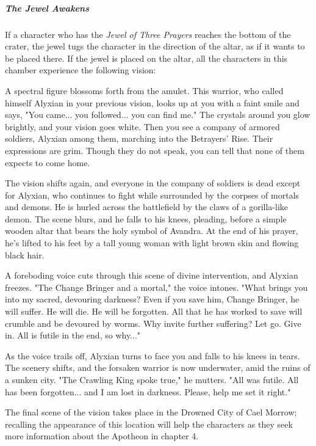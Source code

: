 \documentclass[10pt,a4paper,twoside,bg=print,twocolumn,openany,nodeprecatedcode]{dndbook}
\begin{document}
\subparagraph{The Jewel Awakens}
If a character who has the \textit{Jewel of Three Prayers} reaches the bottom of the crater, the jewel tugs the character in the direction of the altar, as if it wants to be placed there. If the jewel is placed on the altar, all the characters in this chamber experience the following vision:

\begin{DndReadAloud}{}
A spectral figure blossoms forth from the amulet. This warrior, who called himself Alyxian in your previous vision, looks up at you with a faint smile and says, "You came... you followed... you can find me." The crystals around you glow brightly, and your vision goes white. Then you see a company of armored soldiers, Alyxian among them, marching into the Betrayers' Rise. Their expressions are grim. Though they do not speak, you can tell that none of them expects to come home.

The vision shifts again, and everyone in the company of soldiers is dead except for Alyxian, who continues to fight while surrounded by the corpses of mortals and demons. He is hurled across the battlefield by the claws of a gorilla-like demon. The scene blurs, and he falls to his knees, pleading, before a simple wooden altar that bears the holy symbol of Avandra. At the end of his prayer, he's lifted to his feet by a tall young woman with light brown skin and flowing black hair.

A foreboding voice cuts through this scene of divine intervention, and Alyxian freezes. "The Change Bringer and a mortal," the voice intones. "What brings you into my sacred, devouring darkness? Even if you save him, Change Bringer, he will suffer. He will die. He will be forgotten. All that he has worked to save will crumble and be devoured by worms. Why invite further suffering? Let go. Give in. All is futile in the end, so why..."

As the voice trails off, Alyxian turns to face you and falls to his knees in tears. The scenery shifts, and the forsaken warrior is now underwater, amid the ruins of a sunken city. "The Crawling King spoke true," he mutters. "All was futile. All has been forgotten... and I am lost in darkness. Please, help me set it right."

\end{DndReadAloud}

The final scene of the vision takes place in the Drowned City of Cael Morrow; recalling the appearance of this location will help the characters as they seek more information about the Apotheon in chapter 4.
\end{document}

